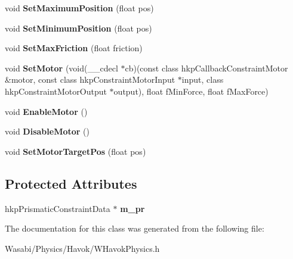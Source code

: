 \begin{DoxyCompactItemize}
\item 
void {\bfseries Set\+Maximum\+Position} (float pos)\hypertarget{class_w_prismatic_constraint_a93ec322e76b0254715266ba5bac101c7}{}\label{class_w_prismatic_constraint_a93ec322e76b0254715266ba5bac101c7}

\item 
void {\bfseries Set\+Minimum\+Position} (float pos)\hypertarget{class_w_prismatic_constraint_a231dd51752f5bd4a91c53b464fd71ed0}{}\label{class_w_prismatic_constraint_a231dd51752f5bd4a91c53b464fd71ed0}

\item 
void {\bfseries Set\+Max\+Friction} (float friction)\hypertarget{class_w_prismatic_constraint_a895bb17544a3979ebe795290930d8ae3}{}\label{class_w_prismatic_constraint_a895bb17544a3979ebe795290930d8ae3}

\item 
void {\bfseries Set\+Motor} (void(\+\_\+\+\_\+cdecl $\ast$cb)(const class hkp\+Callback\+Constraint\+Motor \&motor, const class hkp\+Constraint\+Motor\+Input $\ast$input, class hkp\+Constraint\+Motor\+Output $\ast$output), float f\+Min\+Force, float f\+Max\+Force)\hypertarget{class_w_prismatic_constraint_a4c81b0ffe56da58053f143a9abadd4ca}{}\label{class_w_prismatic_constraint_a4c81b0ffe56da58053f143a9abadd4ca}

\item 
void {\bfseries Enable\+Motor} ()\hypertarget{class_w_prismatic_constraint_ab79cf381c615732ab6c6acc9ece8a787}{}\label{class_w_prismatic_constraint_ab79cf381c615732ab6c6acc9ece8a787}

\item 
void {\bfseries Disable\+Motor} ()\hypertarget{class_w_prismatic_constraint_a0cf5cccd6adce1b97e4f365a455e2b0e}{}\label{class_w_prismatic_constraint_a0cf5cccd6adce1b97e4f365a455e2b0e}

\item 
void {\bfseries Set\+Motor\+Target\+Pos} (float pos)\hypertarget{class_w_prismatic_constraint_aabb1a36f74cedc6c7bfc5e678dde38c6}{}\label{class_w_prismatic_constraint_aabb1a36f74cedc6c7bfc5e678dde38c6}

\end{DoxyCompactItemize}
\subsection*{Protected Attributes}
\begin{DoxyCompactItemize}
\item 
hkp\+Prismatic\+Constraint\+Data $\ast$ {\bfseries m\+\_\+pr}\hypertarget{class_w_prismatic_constraint_afe55553ef994e814d9155fb213c2fec3}{}\label{class_w_prismatic_constraint_afe55553ef994e814d9155fb213c2fec3}

\end{DoxyCompactItemize}


The documentation for this class was generated from the following file\+:\begin{DoxyCompactItemize}
\item 
Wasabi/\+Physics/\+Havok/W\+Havok\+Physics.\+h\end{DoxyCompactItemize}
